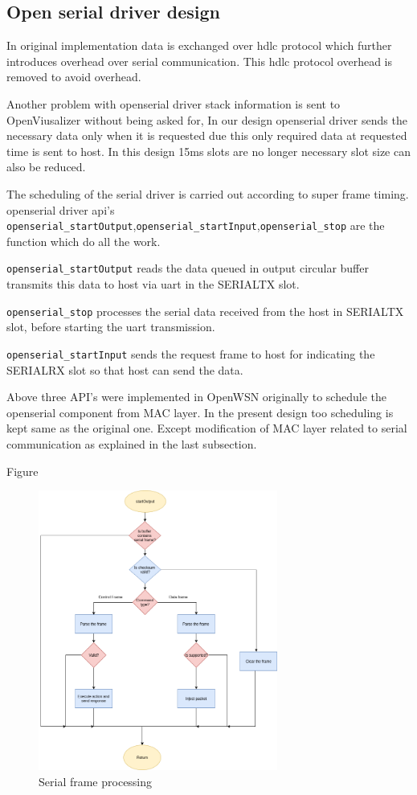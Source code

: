 \subsection{Open serial driver design}
In original implementation data is exchanged over hdlc protocol which further introduces overhead over serial communication. This hdlc protocol overhead is removed to avoid overhead.

Another problem with openserial driver stack information is sent to OpenViusalizer without being asked for, In our design openserial driver sends the necessary data only when it is requested due this only required data at requested time is sent to host. In this design 15ms slots are no longer necessary slot size can also be reduced.


The scheduling of the serial driver is carried out according to super frame timing. openserial driver api's \texttt{openserial\_startOutput},\texttt{openserial\_startInput},\texttt{openserial\_stop} are the function which do all the work.

\texttt{openserial\_startOutput} reads the data queued in output circular buffer transmits this data to host via uart in the SERIALTX slot.

\texttt{openserial\_stop} processes the serial data received from the host in SERIALTX slot, before starting the uart transmission.

\texttt{openserial\_startInput} sends the request frame to host for indicating the SERIALRX slot so that host can send the data.

Above three API's were implemented in OpenWSN originally to schedule the openserial component from MAC layer. In the present design too scheduling is kept same as the original one. Except modification of MAC layer related to serial communication as explained in the last subsection.

Figure

\begin{figure}
	\includegraphics[width=0.7\textwidth,center]{Openserial_startOutput.png}
	\caption{Serial frame processing}
	\label{fig:Openserial_startOutput}
\end{figure}


